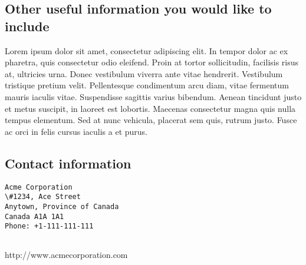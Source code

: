 \documentclass[12pt]{article}
\begin{document}
\subsection*{Other useful information you would like to include}
 Lorem ipsum dolor sit amet, consectetur adipiscing elit. In tempor dolor ac ex pharetra, quis consectetur odio eleifend. Proin at tortor sollicitudin, facilisis risus at, ultricies urna. Donec vestibulum viverra ante vitae hendrerit. Vestibulum tristique pretium velit. Pellentesque condimentum arcu diam, vitae fermentum mauris iaculis vitae. Suspendisse sagittis varius bibendum. Aenean tincidunt justo et metus suscipit, in laoreet est lobortis. Maecenas consectetur magna quis nulla tempus elementum. Sed at nunc vehicula, placerat sem quis, rutrum justo. Fusce ac orci in felis cursus iaculis a et purus.



\pagebreak

\subsection*{Contact information}

\begin{verbatim}
Acme Corporation
\#1234, Ace Street
Anytown, Province of Canada
Canada A1A 1A1
Phone: +1-111-111-111
 

\end{verbatim}

\noindent http://www.acmecorporation.com

 
\end{document}
